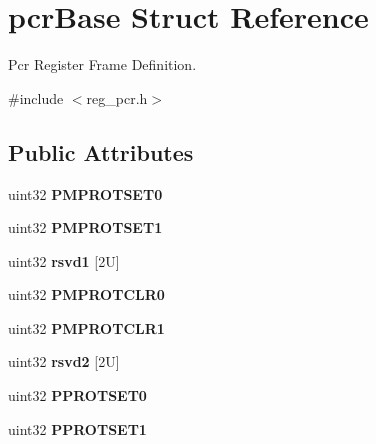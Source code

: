 \hypertarget{structpcrBase}{}\section{pcr\+Base Struct Reference}
\label{structpcrBase}


Pcr Register Frame Definition.  




{\ttfamily \#include $<$reg\+\_\+pcr.\+h$>$}

\subsection*{Public Attributes}
\begin{DoxyCompactItemize}
\item 
\mbox{\label{structpcrBase_aa56fbf3ad77d6ba0981af927aed161cc}} 
uint32 {\bfseries P\+M\+P\+R\+O\+T\+S\+E\+T0}
\item 
\mbox{\label{structpcrBase_aea9490e37d6eff05aefad57eb296230f}} 
uint32 {\bfseries P\+M\+P\+R\+O\+T\+S\+E\+T1}
\item 
\mbox{\label{structpcrBase_a63b03277a0d701a2f489742161eab072}} 
uint32 {\bfseries rsvd1} \mbox{[}2\+U\mbox{]}
\item 
\mbox{\label{structpcrBase_a8c4c637cf870e8170f09d4f899b5c9f8}} 
uint32 {\bfseries P\+M\+P\+R\+O\+T\+C\+L\+R0}
\item 
\mbox{\label{structpcrBase_a6cdf34d8de107f5372d85a64723316c7}} 
uint32 {\bfseries P\+M\+P\+R\+O\+T\+C\+L\+R1}
\item 
\mbox{\label{structpcrBase_aa1cdbcdfa330fbc84d94add5c4f1743a}} 
uint32 {\bfseries rsvd2} \mbox{[}2\+U\mbox{]}
\item 
\mbox{\label{structpcrBase_ae4b285e8742c0bf09f66a9f30d153078}} 
uint32 {\bfseries P\+P\+R\+O\+T\+S\+E\+T0}
\item 
\mbox{\label{structpcrBase_a919ffe7627ce5b2a38f798713e5cd2cf}} 
uint32 {\bfseries P\+P\+R\+O\+T\+S\+E\+T1}
\item 
\mbox{\label{structpcrBase_ad946eab9a7f58995e950fa30eb9b0386}} 

\end{DoxyCompactItemize}
